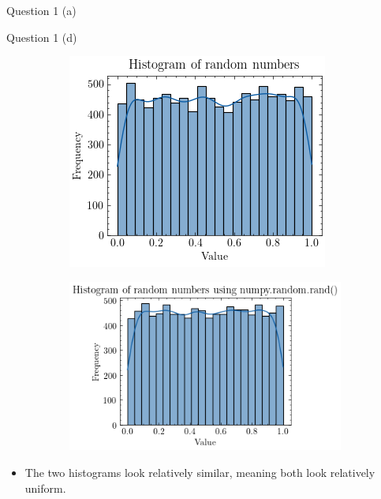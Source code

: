 \documentclass[compress,12pt]{beamer}
\begin{document}
\begin{frame}{Question 1 (a)}
\begin{frame}{Question 1 (d)}
      \begin{figure}
            \centering
            \begin{subfigure}{0.45\textwidth}
                  \centering
                  \includegraphics[scale=0.5]{imgs/1a.png}
            \end{subfigure}
            \begin{subfigure}{0.45\textwidth}
                  \centering
                  \includegraphics[scale=0.5]{imgs/1d.png}
            \end{subfigure}
      \end{figure}

      \begin{itemize}
            \item The two histograms look relatively similar, meaning both look relatively uniform.
      \end{itemize}
\end{frame}


\end{frame}
\end{document}
